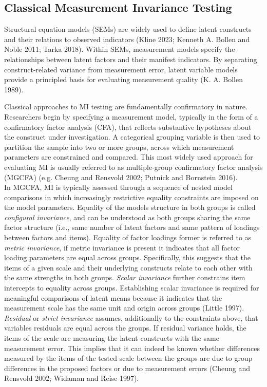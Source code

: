 \documentclass[
  man,
  floatsintext]{apa7}
\begin{document}
\subsection{Classical Measurement Invariance
Testing}\label{classical-measurement-invariance-testing}

Structural equation models (SEMs) are widely used to define latent
constructs and their relations to observed indicators (Kline 2023;
Kenneth A. Bollen and Noble 2011; Tarka 2018). Within SEMs, measurement
models specify the relationships between latent factors and their
manifest indicators. By separating construct-related variance from
measurement error, latent variable models provide a principled basis for
evaluating measurement quality (K. A. Bollen 1989).

Classical approaches to MI testing are fundamentally confirmatory in
nature. Researchers begin by specifying a measurement model, typically
in the form of a confirmatory factor analysis (CFA), that reflects
substantive hypotheses about the construct under investigation. A
categorical grouping variable is then used to partition the sample into
two or more groups, across which measurement parameters are constrained
and compared. This most widely used approach for evaluating MI is
usually referred to as multiple-group confirmatory factor analysis
(MGCFA) (e.g. Cheung and Rensvold 2002; Putnick and Bornstein 2016).\\
In MGCFA, MI is typically assessed through a sequence of nested model
comparisons in which increasingly restrictive equality constraints are
imposed on the model parameters. Equality of the models structure in
both groups is called \emph{configural invariance}, and can be
understood as both groups sharing the same factor structure (i.e., same
number of latent factors and same pattern of loadings between factors
and items). Equality of factor loadings former is referred to as
\emph{metric invariance}, if metric invariance is present it indicates
that all factor loading parameters are equal across groups. Speciﬁcally,
this suggests that the items of a given scale and their underlying
constructs relate to each other with the same strengths in both groups.
\emph{Scalar invariance} further constrains item intercepts to equality
across groups. Establishing scalar invariance is required for meaningful
comparisons of latent means because it indicates that the measurement
scale has the same unit and origin across groups (Little 1997).
\emph{Residual} or \emph{strict invariance} assumes, additionally to the
constraints above, that variables residuals are equal across the groups.
If residual variance holds, the items of the scale are measuring the
latent constructs with the same measurement error. This implies that it
can indeed be known whether differences measured by the items of the
tested scale between the groups are due to group differences in the
proposed factors or due to measurement errors (Cheung and Rensvold 2002;
Widaman and Reise 1997).
\end{document}
